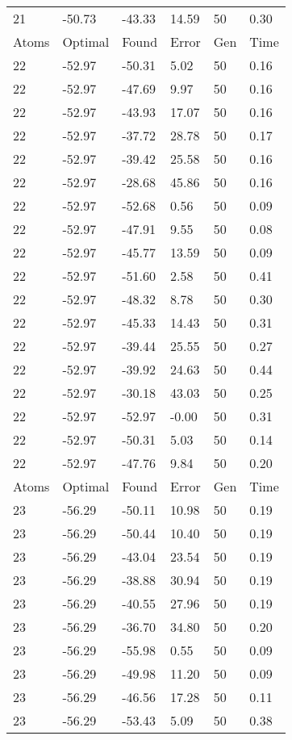 \documentclass{report}
\begin{document}
\begin{appendix}
\begin{longtable}{llllll}
21 & -50.73 & -43.33 & 14.59 & 50 & 0.30 \\
Atoms & Optimal & Found & Error & Gen & Time \\
22 & -52.97 & -50.31 & 5.02 & 50 & 0.16 \\
22 & -52.97 & -47.69 & 9.97 & 50 & 0.16 \\
22 & -52.97 & -43.93 & 17.07 & 50 & 0.16 \\
22 & -52.97 & -37.72 & 28.78 & 50 & 0.17 \\
22 & -52.97 & -39.42 & 25.58 & 50 & 0.16 \\
22 & -52.97 & -28.68 & 45.86 & 50 & 0.16 \\
22 & -52.97 & -52.68 & 0.56 & 50 & 0.09 \\
22 & -52.97 & -47.91 & 9.55 & 50 & 0.08 \\
22 & -52.97 & -45.77 & 13.59 & 50 & 0.09 \\
22 & -52.97 & -51.60 & 2.58 & 50 & 0.41 \\
22 & -52.97 & -48.32 & 8.78 & 50 & 0.30 \\
22 & -52.97 & -45.33 & 14.43 & 50 & 0.31 \\
22 & -52.97 & -39.44 & 25.55 & 50 & 0.27 \\
22 & -52.97 & -39.92 & 24.63 & 50 & 0.44 \\
22 & -52.97 & -30.18 & 43.03 & 50 & 0.25 \\
22 & -52.97 & -52.97 & -0.00 & 50 & 0.31 \\
22 & -52.97 & -50.31 & 5.03 & 50 & 0.14 \\
22 & -52.97 & -47.76 & 9.84 & 50 & 0.20 \\
Atoms & Optimal & Found & Error & Gen & Time \\
23 & -56.29 & -50.11 & 10.98 & 50 & 0.19 \\
23 & -56.29 & -50.44 & 10.40 & 50 & 0.19 \\
23 & -56.29 & -43.04 & 23.54 & 50 & 0.19 \\
23 & -56.29 & -38.88 & 30.94 & 50 & 0.19 \\
23 & -56.29 & -40.55 & 27.96 & 50 & 0.19 \\
23 & -56.29 & -36.70 & 34.80 & 50 & 0.20 \\
23 & -56.29 & -55.98 & 0.55 & 50 & 0.09 \\
23 & -56.29 & -49.98 & 11.20 & 50 & 0.09 \\
23 & -56.29 & -46.56 & 17.28 & 50 & 0.11 \\
23 & -56.29 & -53.43 & 5.09 & 50 & 0.38 \\

\end{longtable}
\end{appendix}
\end{document}
